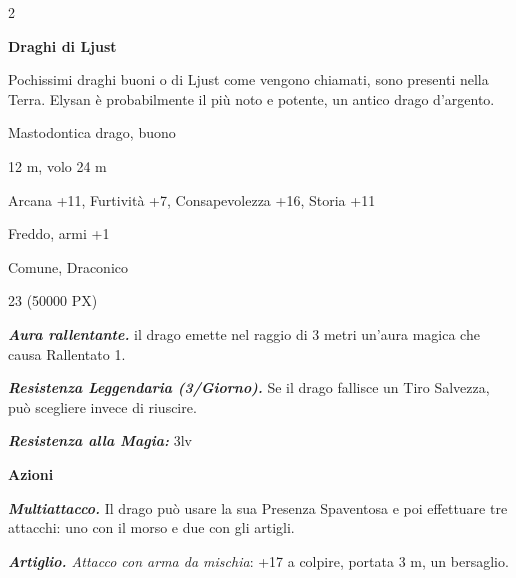 \begin{multicols}{2}
{\medskip

\textbf{Draghi di Ljust}


Pochissimi draghi buoni o di Ljust come vengono chiamati, sono presenti nella Terra.
Elysan è probabilmente il più noto e potente, un antico drago d'argento.

\begin{description}[noitemsep, topsep=0pt, parsep=0pt, partopsep=0pt, itemsep=1pt, leftmargin=2.35cm,  labelwidth=2.2cm, itemindent=0cm, listparindent=0pt] %
\setlength{\baselineskip}{10pt}
\item[\textbf{Taglia/Tipo}] Mastodontica drago, buono
\item[\textbf{Caratt.}] 
\item[\textbf{Punti Ferita}] 
\item[\textbf{Movimento}] 12 m, volo 24 m
\item[\textbf{Tiri Salvez.}] 
\item[\textbf{Comp.}] Arcana +11, Furtività +7, Consapevolezza +16, Storia +11
\item[\textbf{Imm. Danni}] Freddo, armi +1
\item[\textbf{Sensi}] 
\item[\textbf{Linguaggi}] Comune, Draconico
\item[\textbf{Sfida}] 23 (50000 PX)
\end{description}
\smallskip

\emph{\textbf{Aura rallentante.}} il drago emette nel raggio di 3 metri un'aura magica che causa Rallentato 1.

\emph{\textbf{Resistenza Leggendaria (3/Giorno).}} Se il drago fallisce un Tiro Salvezza, può scegliere invece di riuscire.

\emph{\textbf{Resistenza alla Magia:}} 3lv

\textbf{Azioni}

\emph{\textbf{Multiattacco.}} Il drago può usare la sua Presenza Spaventosa e poi effettuare tre attacchi: uno con il morso e due con gli artigli.

\emph{\textbf{Artiglio.} Attacco con arma da mischia}: +17 a colpire, portata 3 m, un bersaglio.

}
\end{multicols}

